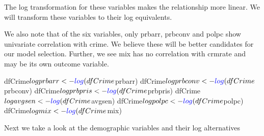 \documentclass[]{article}
\newenvironment{Shaded}{}{}
\newcommand{\KeywordTok}[1]{\textcolor[rgb]{0.00,0.00,1.00}{#1}}
\newcommand{\NormalTok}[1]{#1}
\newcommand{\OperatorTok}[1]{#1}
\newcommand{\StringTok}[1]{\textcolor[rgb]{0.00,0.50,0.50}{#1}}
\begin{document}
The log transformation for these variables makes the relationship more
linear. We will transform these variables to their log equivalents.

We also note that of the six variables, only prbarr, prbconv and polpc
show univariate correlation with crime. We believe these will be better
candidates for our model selection. Further, we see mix has no
correlation with crmrate and may be its own outcome variable.

\begin{Shaded}
\begin{Highlighting}[]
\NormalTok{dfCrime}\OperatorTok{$}\NormalTok{logprbarr <-}\StringTok{ }\KeywordTok{log}\NormalTok{(dfCrime}\OperatorTok{$}\NormalTok{prbarr)}
\NormalTok{dfCrime}\OperatorTok{$}\NormalTok{logprbconv <-}\StringTok{ }\KeywordTok{log}\NormalTok{(dfCrime}\OperatorTok{$}\NormalTok{prbconv)}
\NormalTok{dfCrime}\OperatorTok{$}\NormalTok{logprbpris <-}\StringTok{ }\KeywordTok{log}\NormalTok{(dfCrime}\OperatorTok{$}\NormalTok{prbpris)}
\NormalTok{dfCrime}\OperatorTok{$}\NormalTok{logavgsen <-}\StringTok{ }\KeywordTok{log}\NormalTok{(dfCrime}\OperatorTok{$}\NormalTok{avgsen)}
\NormalTok{dfCrime}\OperatorTok{$}\NormalTok{logpolpc <-}\StringTok{ }\KeywordTok{log}\NormalTok{(dfCrime}\OperatorTok{$}\NormalTok{polpc)}
\NormalTok{dfCrime}\OperatorTok{$}\NormalTok{logmix <-}\StringTok{ }\KeywordTok{log}\NormalTok{(dfCrime}\OperatorTok{$}\NormalTok{mix)}
\end{Highlighting}
\end{Shaded}

Next we take a look at the demographic variables and their log
alternatives
\end{document}
